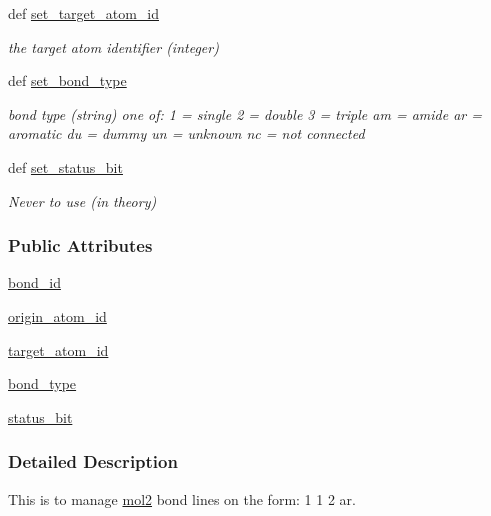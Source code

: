\begin{DoxyCompactItemize}
def \hyperlink{classforcebalance_1_1Mol2_1_1mol2__bond_afbc8421033001dbf5d29cccee1f503e3}{set\-\_\-target\-\_\-atom\-\_\-id}
\begin{DoxyCompactList}\small\item\em the target atom identifier (integer) \end{DoxyCompactList}\item 
def \hyperlink{classforcebalance_1_1Mol2_1_1mol2__bond_a1ced365259f0c6b7b4fa0f0d9fc5dc4d}{set\-\_\-bond\-\_\-type}
\begin{DoxyCompactList}\small\item\em bond type (string) one of\-: 1 = single 2 = double 3 = triple am = amide ar = aromatic du = dummy un = unknown nc = not connected \end{DoxyCompactList}\item 
def \hyperlink{classforcebalance_1_1Mol2_1_1mol2__bond_a1c2a0d5ae943de6bd80b4e32e956b09a}{set\-\_\-status\-\_\-bit}
\begin{DoxyCompactList}\small\item\em Never to use (in theory) \end{DoxyCompactList}\end{DoxyCompactItemize}
\subsubsection*{Public Attributes}
\begin{DoxyCompactItemize}
\item 
\hyperlink{classforcebalance_1_1Mol2_1_1mol2__bond_a4beddc1bfbe7a937e6c50574320c3c6e}{bond\-\_\-id}
\item 
\hyperlink{classforcebalance_1_1Mol2_1_1mol2__bond_ae24bf013368c83923716d78ae6e393b1}{origin\-\_\-atom\-\_\-id}
\item 
\hyperlink{classforcebalance_1_1Mol2_1_1mol2__bond_a6889a23790bd2b0ab5acc4c1143c565e}{target\-\_\-atom\-\_\-id}
\item 
\hyperlink{classforcebalance_1_1Mol2_1_1mol2__bond_af9fe955c88cbf454863d50c871d3bd67}{bond\-\_\-type}
\item 
\hyperlink{classforcebalance_1_1Mol2_1_1mol2__bond_a0362163c09f7a0fbf65f36fe547535e9}{status\-\_\-bit}
\end{DoxyCompactItemize}


\subsubsection{Detailed Description}
This is to manage \hyperlink{classforcebalance_1_1Mol2_1_1mol2}{mol2} bond lines on the form\-: 1 1 2 ar. 

